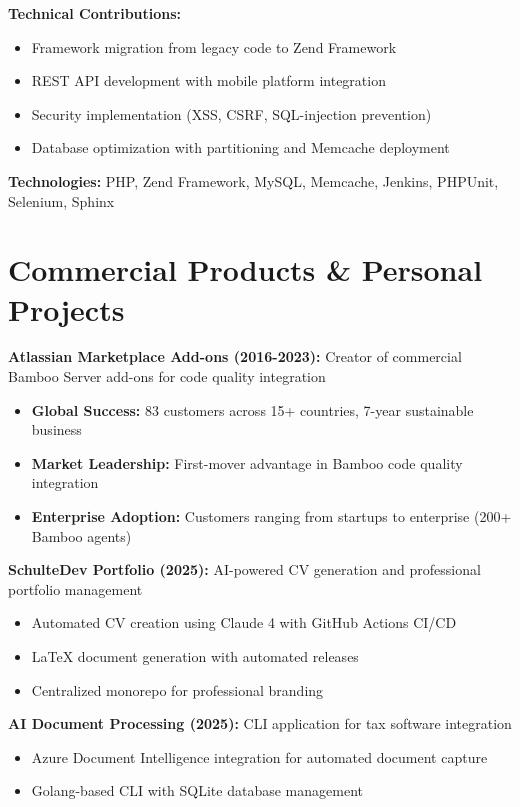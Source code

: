 \documentclass[11pt,a4paper]{article}
\begin{document}
\textbf{Technical Contributions:}
\begin{itemize}[leftmargin=*,noitemsep,topsep=0pt]
\item Framework migration from legacy code to Zend Framework
\item REST API development with mobile platform integration
\item Security implementation (XSS, CSRF, SQL-injection prevention)
\item Database optimization with partitioning and Memcache deployment
\end{itemize}

\textbf{Technologies:} PHP, Zend Framework, MySQL, Memcache, Jenkins, PHPUnit, Selenium, Sphinx

\section{Commercial Products \& Personal Projects}

\textbf{Atlassian Marketplace Add-ons (2016-2023):} Creator of commercial Bamboo Server add-ons for code quality integration
\begin{itemize}[leftmargin=*,noitemsep,topsep=0pt]
\item \textbf{Global Success:} 83 customers across 15+ countries, 7-year sustainable business
\item \textbf{Market Leadership:} First-mover advantage in Bamboo code quality integration
\item \textbf{Enterprise Adoption:} Customers ranging from startups to enterprise (200+ Bamboo agents)
\end{itemize}

\textbf{SchulteDev Portfolio (2025):} AI-powered CV generation and professional portfolio management
\begin{itemize}[leftmargin=*,noitemsep,topsep=0pt]
\item Automated CV creation using Claude 4 with GitHub Actions CI/CD
\item LaTeX document generation with automated releases
\item Centralized monorepo for professional branding
\end{itemize}

\textbf{AI Document Processing (2025):} CLI application for tax software integration
\begin{itemize}[leftmargin=*,noitemsep,topsep=0pt]
\item Azure Document Intelligence integration for automated document capture
\item Golang-based CLI with SQLite database management
\end{itemize}
\end{document}
